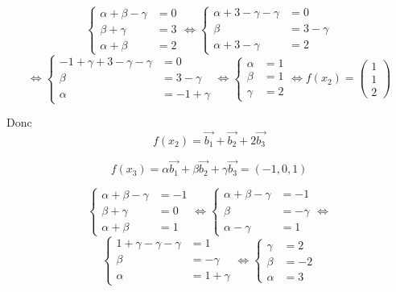 \documentclass[a4paper,12pt]{article}
\begin{document}
$$
    \left\{\begin{array}{rl}
        \alpha+\beta-\gamma&=0 \\
        \beta+\gamma&=3 \\
        \alpha+\beta&=2
    \end{array}\right.
    \Leftrightarrow
    \left\{\begin{array}{rl}
        \alpha+3-\gamma-\gamma&=0 \\
        \beta&=3-\gamma \\
        \alpha+3-\gamma&=2 
    \end{array}\right.
$$
$$
    \Leftrightarrow
    \left\{\begin{array}{rl}
        -1+\gamma+3-\gamma-\gamma&=0 \\
        \beta&=3-\gamma \\
        \alpha&=-1+\gamma
    \end{array}\right.
    \Leftrightarrow
    \left\{\begin{array}{rl}
        \alpha&=1 \\
        \beta&=1 \\
        \gamma&=2
    \end{array}\right.
    \Leftrightarrow
    f(x_2)=\begin{pmatrix}1\\1\\2\end{pmatrix}
$$

Donc $$f(x_2)=\vec{b_1}+\vec{b_2}+2\vec{b_3}$$

$$f(x_3)=\alpha\vec{b_1}+\beta\vec{b_2}+\gamma\vec{b_3}=(-1,0,1)$$

$$
    \left\{\begin{array}{rl}
        \alpha+\beta-\gamma&=-1 \\
        \beta+\gamma&=0 \\
        \alpha+\beta&=1
    \end{array}\right.
    \Leftrightarrow
    \left\{\begin{array}{rl}
        \alpha+\beta-\gamma&=-1 \\
        \beta&=-\gamma \\
        \alpha-\gamma&=1
    \end{array}\right.
    \Leftrightarrow
$$
$$
    \left\{\begin{array}{rl}
        1+\gamma-\gamma-\gamma&=1 \\
        \beta&=-\gamma \\
        \alpha&=1+\gamma
    \end{array}\right.
    \Leftrightarrow
    \left\{\begin{array}{rl}
        \gamma&=2 \\
        \beta&=-2 \\
        \alpha&=3
    \end{array}\right.
$$
\end{document}
